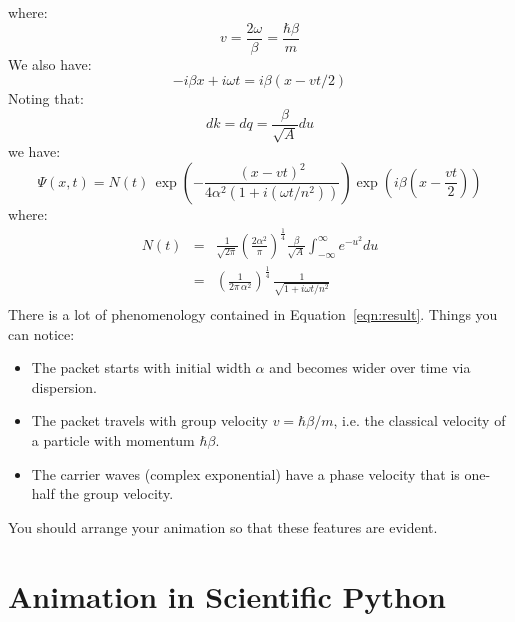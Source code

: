 \documentclass[12pt]{article}
\begin{document}
where:
$$v = \frac{2\omega}{\beta} = \frac{\hbar \beta}{m}$$
We also have:
$$-i\beta x + i\omega t = i \beta (x - v t / 2)$$
Noting that:
$$dk = dq = \frac{\beta}{\sqrt{A}} du$$
we have:
\begin{equation}
\label{eqn:result}
\Psi(x,t) = N(t) \, \exp\left( -\frac{(x - v t)^2}{4 \alpha^2 (1 + i (\omega t / n^2))} \right)
\exp\left(i\beta\left(x-\frac{vt}{2}\right)\right)
\end{equation}
where:
\begin{eqnarray*}
  N(t) &=& \frac{1}{\sqrt{2\pi}} \left( \frac{2\alpha^2}{\pi} \right)^\frac{1}{4} \frac{\beta}{\sqrt{A}} \int_{-\infty}^{\infty} e^{-u^2} du\\ 
  &=& \left( \frac{1}{2\pi \, \alpha^2} \right)^\frac{1}{4} \, \frac{1}{\sqrt{1 + i \omega t/n^2}}\\
\end{eqnarray*}
There is a lot of phenomenology contained in Equation~\ref{eqn:result}.  Things you can notice:
\begin{itemize}
\item The packet starts with initial width $\alpha$ and becomes wider over time via dispersion.
\item The packet travels with group velocity $v=\hbar \beta/m$, i.e. the classical velocity of a particle with momentum $\hbar \beta$.
\item The carrier waves (complex exponential) have a phase velocity that is one-half the group velocity.
\end{itemize}
You should arrange your animation so that these features are evident.

\section{Animation in Scientific Python}
\end{document}
